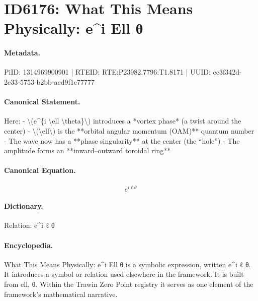 \section*{ID6176: What This Means Physically: e\textasciicircum{}i Ell θ}
\paragraph{Metadata.}
PiID: 1314969900901 | RTEID: RTE:P23982.7796:T1.8171 | UUID: cc3f342d-2e33-5753-b2bb-aed9f1c77777

\paragraph{Canonical Statement.}
Here: - \textbackslash{}(e\textasciicircum{}\{i \textbackslash{}ell \textbackslash{}theta\}\textbackslash{}) introduces a *vortex phase* (a twist around the center) - \textbackslash{}(\textbackslash{}ell\textbackslash{}) is the **orbital angular momentum (OAM)** quantum number - The wave now has a **phase singularity** at the center (the “hole”) - The amplitude forms an **inward–outward toroidal ring**

\paragraph{Canonical Equation.}
\[
e^{i \ell \theta}
\]

\paragraph{Dictionary.}
Relation: e\textasciicircum{}i ℓ θ

\paragraph{Encyclopedia.}
What This Means Physically: e\textasciicircum{}i Ell θ is a symbolic expression, written e\textasciicircum{}i ℓ θ. It introduces a symbol or relation used elsewhere in the framework. It is built from ell, θ. Within the Trawin Zero Point registry it serves as one element of the framework's mathematical narrative.
